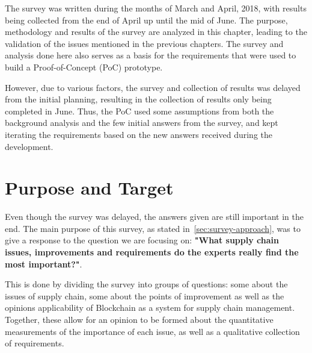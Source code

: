 The survey was written during the months of March and April, 2018, with results being collected from the end of April up until the mid of June. The purpose, methodology and results of the survey are analyzed in this chapter, leading to the validation of the issues mentioned in the previous chapters. The survey and analysis done here also serves as a basis for the requirements that were used to build a Proof-of-Concept (PoC) prototype. 

However, due to various factors, the survey and collection of results was delayed from the initial planning, resulting in the collection of results only being completed in June. Thus, the PoC used some assumptions from both the background analysis and the few initial answers from the survey, and kept iterating the requirements based on the new answers received during the development. 




\section{Purpose and Target}
Even though the survey was delayed, the answers given are still important in the end. The main purpose of this survey, as stated in~\ref{sec:survey-approach}, was to give a response to the question we are focusing on: \textbf{"What supply chain issues, improvements and requirements do the experts really find the most important?"}. 


This is done by dividing the survey into groups of questions: some about the issues of supply chain, some about the points of improvement as well as the opinions applicability of Blockchain as a system for supply chain management. Together, these allow for an opinion to be formed about the quantitative measurements of the importance of each issue, as well as a qualitative collection of requirements.

